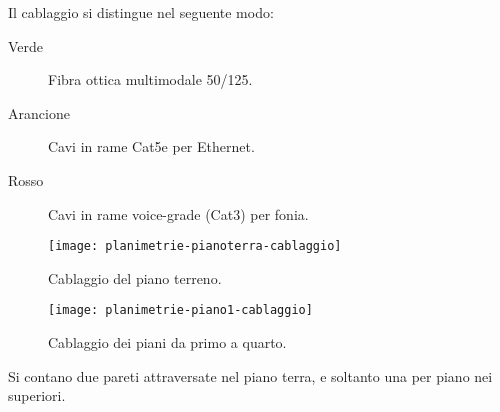 Il cablaggio si distingue nel seguente modo:
\begin{description}
  \item[Verde] Fibra ottica multimodale 50/125.
  \item[Arancione] Cavi in rame Cat5e per Ethernet.
  \item[Rosso] Cavi in rame voice-grade (Cat3) per fonia.
\end{description}

\begin{figure}[ht]
  \texttt{[image: planimetrie-pianoterra-cablaggio]}
  \caption{Cablaggio del piano terreno.}\label{fig:planimetria-terreno-cablaggio}
\end{figure}

\begin{figure}[ht]
  \texttt{[image: planimetrie-piano1-cablaggio]}
  \caption{Cablaggio dei piani da primo a quarto.}\label{fig:planimetria-1-cablaggio}
\end{figure}

Si contano due pareti attraversate nel piano terra, e soltanto una per piano nei superiori.
